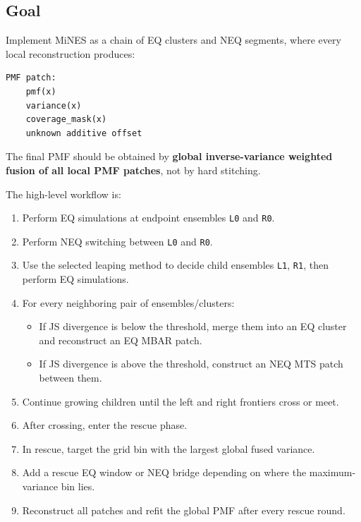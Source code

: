 \documentclass[
  10.5pt,
]{article}
\newcommand{\passthrough}[1]{#1}
\providecommand{\tightlist}{%
  \setlength{\itemsep}{0pt}\setlength{\parskip}{0pt}}
\begin{document}
\subsection{Goal}\label{goal}

Implement MiNES as a chain of EQ clusters and NEQ segments, where every
local reconstruction produces:

\begin{lstlisting}[language=Python]
PMF patch:
    pmf(x)
    variance(x)
    coverage_mask(x)
    unknown additive offset
\end{lstlisting}

The final PMF should be obtained by \textbf{global inverse-variance
weighted fusion of all local PMF patches}, not by hard stitching.

The high-level workflow is:

\begin{enumerate}
\def\labelenumi{\arabic{enumi}.}
\tightlist
\item
  Perform EQ simulations at endpoint ensembles
  \passthrough{\lstinline!L0!} and \passthrough{\lstinline!R0!}.
\item
  Perform NEQ switching between \passthrough{\lstinline!L0!} and
  \passthrough{\lstinline!R0!}.
\item
  Use the selected leaping method to decide child ensembles
  \passthrough{\lstinline!L1!}, \passthrough{\lstinline!R1!}, then
  perform EQ simulations.
\item
  For every neighboring pair of ensembles/clusters:

  \begin{itemize}
  \tightlist
  \item
    If JS divergence is below the threshold, merge them into an EQ
    cluster and reconstruct an EQ MBAR patch.
  \item
    If JS divergence is above the threshold, construct an NEQ MTS patch
    between them.
  \end{itemize}
\item
  Continue growing children until the left and right frontiers cross or
  meet.
\item
  After crossing, enter the rescue phase.
\item
  In rescue, target the grid bin with the largest global fused variance.
\item
  Add a rescue EQ window or NEQ bridge depending on where the
  maximum-variance bin lies.
\item
  Reconstruct all patches and refit the global PMF after every rescue
  round.
\end{enumerate}
\end{document}
